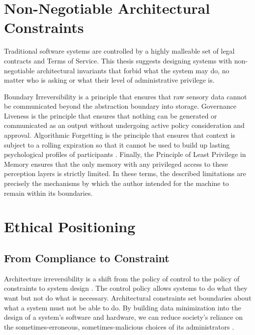 \documentclass[conference]{IEEEtran}
\begin{document}
\section{Non-Negotiable Architectural Constraints}

Traditional software systems are controlled by a highly malleable set of legal contracts and Terms of Service. This thesis suggests designing systems with non-negotiable architectural invariants that forbid what the system may do, no matter who is asking or what their level of administrative privilege is.

Boundary Irreversibility is a principle that ensures that raw sensory data cannot be communicated beyond the abstraction boundary into storage. Governance Liveness is the principle that ensures that nothing can be generated or communicated as an output without undergoing active policy consideration and approval. Algorithmic Forgetting is the principle that ensures that context is subject to a rolling expiration so that it cannot be used to build up lasting psychological profiles of participants \cite{b16}. Finally, the Principle of Least Privilege in Memory ensures that the only memory with any privileged access to these perception layers is strictly limited. In these terms, the described limitations are precisely the mechanisms by which the author intended for the machine to remain within its boundaries.

\section{Ethical Positioning}

\subsection{From Compliance to Constraint}
Architecture irreversibility is a shift from the policy of control to the policy of constraints to system design \cite{b9}. The control policy allows systems to do what they want but not do what is necessary. Architectural constraints set boundaries about what a system must not be able to do. By building data minimization into the design of a system’s software and hardware, we can reduce society’s reliance on the sometimes-erroneous, sometimes-malicious choices of its administrators \cite{b21}.
\end{document}
